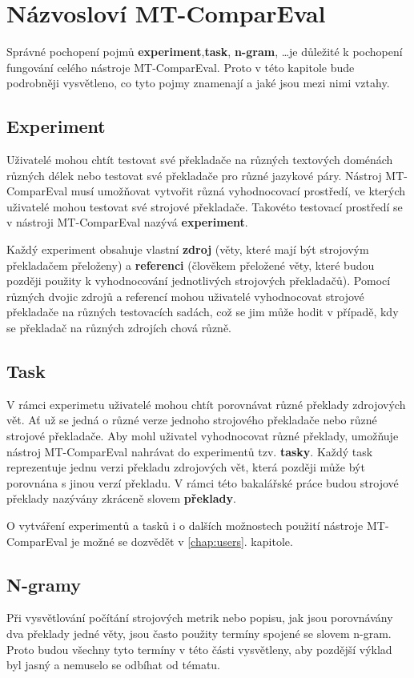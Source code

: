 \chapter{Názvosloví MT-ComparEval}
\label{chap:experiments}

Správné pochopení pojmů \textbf{experiment},\textbf{task}, \textbf{n-gram}, \dots je důležité k pochopení fungování celého nástroje MT-ComparEval.
Proto v této kapitole bude podrobněji vysvětleno,
  co tyto pojmy znamenají a jaké jsou mezi nimi vztahy.

\section{Experiment}
Uživatelé mohou chtít testovat své překladače na různých textových doménách různých délek
  nebo testovat své překladače pro různé jazykové páry.
Nástroj MT-ComparEval musí umožňovat vytvořit různá vyhodnocovací prostředí,
  ve kterých uživatelé mohou testovat své strojové překladače.
Takovéto testovací prostředí se v nástroji MT-ComparEval nazývá \textbf{experiment}.

Každý experiment obsahuje vlastní \textbf{zdroj} (věty, které mají být strojovým překladačem přeloženy) a
  \textbf{referenci} (člověkem přeložené věty, které budou později použity k vyhodnocování jednotlivých strojových překladačů).
Pomocí různých dvojic zdrojů a referencí mohou uživatelé vyhodnocovat strojové překladače na různých testovacích sadách,
  což se jim může hodit v případě,
  kdy se překladač na různých zdrojích chová různě.

\section{Task}
V rámci experimetu uživatelé mohou chtít porovnávat různé překlady zdrojových vět.
Ať už se jedná o různé verze jednoho strojového překladače nebo různé strojové překladače.
Aby mohl uživatel vyhodnocovat různé překlady,
  umožňuje nástroj MT-ComparEval nahrávat do experimentů tzv. \textbf{tasky}.
Každý task reprezentuje jednu verzi překladu zdrojových vět,
  která později může být porovnána s jinou verzí překladu.
V rámci této bakalářské práce budou strojové překlady nazývány zkráceně slovem \textbf{překlady}.

O vytváření experimentů a tasků i o dalších možnostech použití nástroje MT-ComparEval je možné se dozvědět v \ref{chap:users}. kapitole.

\section{N-gramy}
Při vysvětlování počítání strojových metrik
  nebo popisu, jak jsou porovnávány dva překlady jedné věty,
  jsou často použity termíny spojené se slovem n-gram.
Proto budou všechny tyto termíny v této části vysvětleny,
  aby pozdější výklad byl jasný a nemuselo se odbíhat od tématu.

